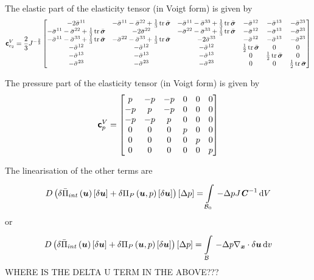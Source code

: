 The elastic part of the elasticity tensor (in Voigt form) is given by
\begin{equation}
  \tensorfour{c}_{e_{2}}^{V}=\frac{2}{3}J^{-\frac{2}{3}}\begin{bmatrix}
    -2\bar{\sigma}^{11} & -\bar{\sigma}^{11}-\bar{\sigma}^{22}+\frac{1}{3}\trace{}{\bar{\tensor{\sigma}}}
    & -\bar{\sigma}^{11}-\bar{\sigma}^{33}+\frac{1}{3}\trace{}{\bar{\tensor{\sigma}}}
    & -\bar{\sigma}^{12} & -\bar{\sigma}^{13} & -\bar{\sigma}^{23} \\
    -\bar{\sigma}^{11}-\bar{\sigma}^{22}+\frac{1}{3}\trace{}{\bar{\tensor{\sigma}}}
    & -2\bar{\sigma}^{22}
    & -\bar{\sigma}^{22}-\bar{\sigma}^{33}+\frac{1}{3}\trace{}{\bar{\tensor{\sigma}}}
    & -\bar{\sigma}^{12} & -\bar{\sigma}^{13} & -\bar{\sigma}^{23} \\
    -\bar{\sigma}^{11}-\bar{\sigma}^{33}+\frac{1}{3}\trace{}{\bar{\tensor{\sigma}}}
    & -\bar{\sigma}^{22}-\bar{\sigma}^{33}+\frac{1}{3}\trace{}{\bar{\tensor{\sigma}}}
    & -2\bar{\sigma}^{33} 
    & -\bar{\sigma}^{12} & -\bar{\sigma}^{13} & -\bar{\sigma}^{23} \\
    -\bar{\sigma}^{12} & -\bar{\sigma}^{12} & -\bar{\sigma}^{12}
    & \frac{1}{2}\trace{}{\bar{\tensor{\sigma}}} & 0 & 0 \\
    -\bar{\sigma}^{13} & -\bar{\sigma}^{13} & -\bar{\sigma}^{13}
    & 0 & \frac{1}{2}\trace{}{\bar{\tensor{\sigma}}} & 0 \\
    -\bar{\sigma}^{23} & -\bar{\sigma}^{23} & -\bar{\sigma}^{23}
    & 0 & 0 & \frac{1}{2}\trace{}{\bar{\tensor{\sigma}}}
  \end{bmatrix}
\end{equation}

The pressure part of the elasticity tensor (in Voigt form) is given by
\begin{equation}
  \boldsymbol{\mathsf{c}}_{p}^{V}=\begin{bmatrix}
   p & -p & -p & 0 & 0 & 0 \\
  -p &  p & -p & 0 & 0 & 0 \\
  -p & -p &  p & 0 & 0 & 0 \\
   0 &  0 &  0 & p & 0 & 0 \\
   0 &  0 &  0 & 0 & p & 0 \\
   0 &  0 &  0 & 0 & 0 & p 
  \end{bmatrix}
\end{equation}

The linearisation of the other terms are
\begin{equation}
  \directionalderiv{}{\variation{\fnof{\bar{\Pi}_{int}}{\vectr{u}}}{\vectr{u}}+\variation{\fnof{\Pi_{P}}{\vectr{u},p}}{\vectr{u}}}{\linearisationdir{p}}=\gint{\embedmanifold{B}_{0}}{}{-\linearisationdir{p}J\inverse{\tensor{C}}}{V}
\end{equation}
or
\begin{equation}
  \directionalderiv{}{\variation{\fnof{\bar{\Pi}_{int}}{\vectr{u}}}{\vectr{u}}+\variation{\fnof{\Pi_{P}}{\vectr{u},p}}{\vectr{u}}}{\linearisationdir{p}}=\gint{\embedmanifold{B}}{}{-\linearisationdir{p}\divergence{\vectr{x}}{\variationdir{\vectr{u}}}}{v}
\end{equation}
WHERE IS THE DELTA U TERM IN THE ABOVE???

